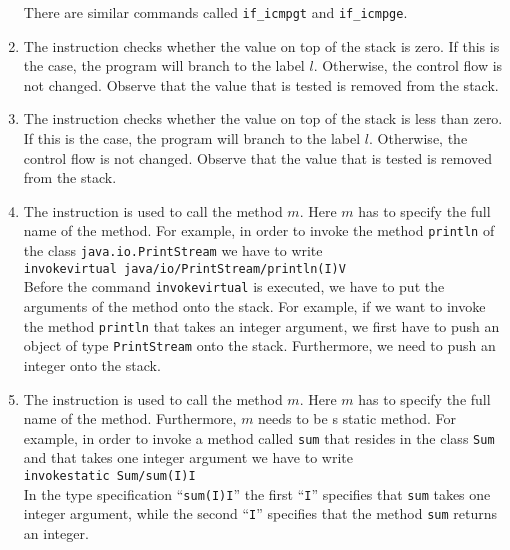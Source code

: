 \begin{enumerate}
      There are similar commands called \texttt{if\_icmpgt} and \texttt{if\_icmpge}.

\item The instruction 
      checks whether the value on top of the stack is zero.  If this is the case, the program will branch
      to the label $l$.  Otherwise, the control flow is not changed.  Observe that the value that is
      tested is removed from the stack.

\item The instruction 
      checks whether the value on top of the stack is less than zero.  If this is the case, the program
      will branch to the label $l$.  Otherwise, the control flow is not changed.  Observe that the value
      that is tested is removed from the stack.

\item The instruction 
      is used to call the method $m$.  Here $m$ has to  specify the full name of the method.
      For example, in order to invoke the method \texttt{println} of the class
      \texttt{java.io.PrintStream} we have to write 
      \\[0.2cm]
      \hspace*{1.3cm}
      \texttt{invokevirtual java/io/PrintStream/println(I)V}
      \\[0.2cm]
      Before the command \texttt{invokevirtual} is executed, we have to put the arguments of the method
      onto the stack.  For example, if we want to invoke the method \texttt{println} that takes an integer
      argument, we first have to push an object of type \texttt{PrintStream} onto the stack.  Furthermore,
      we need to push an integer onto the stack.

\item The instruction 
      is used to call the method $m$.  Here $m$ has to  specify the full name of the method.
      Furthermore, $m$ needs to be s static method.
      For example, in order to invoke a  method called \texttt{sum} that resides in the class \texttt{Sum}
      and that takes one integer argument we have to write 
      \\[0.2cm]
      \hspace*{1.3cm}
      \texttt{invokestatic  Sum/sum(I)I}
      \\[0.2cm]
      In the type specification ``\texttt{sum(I)I}'' the first ``\texttt{I}'' specifies that \texttt{sum}
      takes one integer argument, while the second ``\texttt{I}'' specifies that the method \texttt{sum}
      returns an integer.


\end{enumerate}
